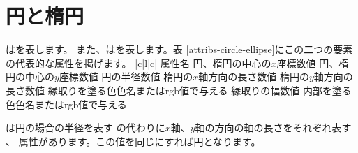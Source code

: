 \section{円と楕円}
はを表します。
また、はを表します。表
\ref{attribs-circle-ellipse}にこの二つの要素の代表的な属性を掲げます。
{|c|l|c|}{%
{属性名}{}{}
{}{円、楕円の中心の$x$座標}{数値}
{}{円、楕円の中心の$y$座標}{数値}
{}{円の半径}{数値}
{}{楕円の$x$軸方向の長さ}{数値}
{}{楕円の$y$軸方向の長さ}{数値}
{}{縁取りを塗る色}{色名またはrgb値で与える}
{}{縁取りの幅}{数値}
{}{内部を塗る色}{色名またはrgb値で与える}}

は円の場合の半径を表す
の代わりに$x$軸、$y$軸の方向の軸の長さをそれぞれ表す
、 属性があります。この値を同じにすれば円となります。
